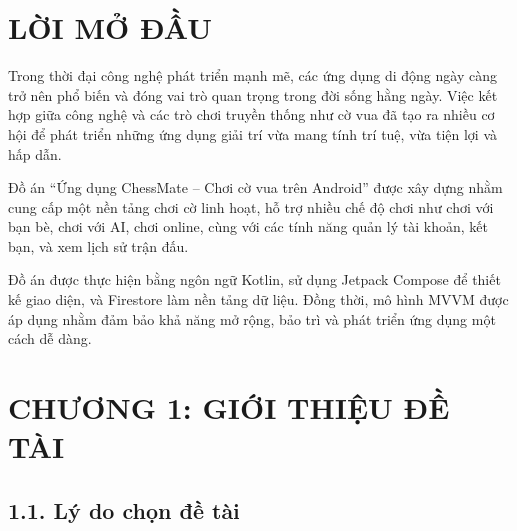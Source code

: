 \documentclass[a4paper,12pt]{article}
\begin{document}
\newpage
\thispagestyle{empty} %

\tableofcontents

\newpage %


\section*{\centering LỜI MỞ ĐẦU} %

\onehalfspacing
\justify
\noindent Trong thời đại công nghệ phát triển mạnh mẽ, các ứng dụng di động ngày càng trở nên phổ biến và đóng vai trò quan trọng trong đời sống hằng ngày. Việc kết hợp giữa công nghệ và các trò chơi truyền thống như cờ vua đã tạo ra nhiều cơ hội để phát triển những ứng dụng giải trí vừa mang tính trí tuệ, vừa tiện lợi và hấp dẫn.

\noindent Đồ án “Ứng dụng ChessMate – Chơi cờ vua trên Android” được xây dựng nhằm cung cấp một nền tảng chơi cờ linh hoạt, hỗ trợ nhiều chế độ chơi như chơi với bạn bè, chơi với AI, chơi online, cùng với các tính năng quản lý tài khoản, kết bạn, và xem lịch sử trận đấu.

\noindent Đồ án được thực hiện bằng ngôn ngữ Kotlin, sử dụng Jetpack Compose để thiết kế giao diện, và Firestore làm nền tảng dữ liệu. Đồng thời, mô hình MVVM được áp dụng nhằm đảm bảo khả năng mở rộng, bảo trì và phát triển ứng dụng một cách dễ dàng.

\bigskip %


\newpage %

\setcounter{page}{1} %

\section*{\centering \textbf{CHƯƠNG 1: GIỚI THIỆU ĐỀ TÀI}} %


\subsection*{1.1. Lý do chọn đề tài} %
\end{document}
